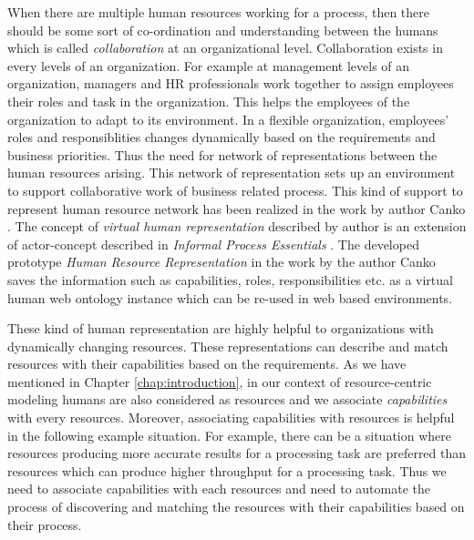 When there are multiple human resources working for a process, then there should be some sort of co-ordination and understanding between the humans which is called \textit{collaboration} at an organizational level. Collaboration exists in every levels of an organization. For example at management levels of an organization, managers and HR professionals work together to assign employees their roles and task in the organization. This helps the employees of the organization to adapt to its environment. In a flexible organization, employees' roles and responsiblities changes dynamically based on the requirements and business priorities. Thus the need for network of representations between the human resources arising. This network of representation sets up an environment to support collaborative work of business related process. This kind of support to represent human resource network has been realized in the work by author Canko \cite{Canko2015}. The concept of \textit{virtual human representation} described by author \cite{Canko2015} is an extension of actor-concept described in \textit{Informal Process Essentials} \cite{Sungur2014a}. The developed prototype \textit{Human Resource Representation} in the work by the author Canko\cite{Canko2015} saves the information such as capabilities, roles, responsibilities etc.  as a virtual human web ontology instance which can be re-used in web based environments.

These kind of human representation are highly helpful to organizations with dynamically changing resources. These representations can describe and match resources with their capabilities based on the requirements. As we have mentioned in Chapter \ref{chap:introduction}, in our context of resource-centric modeling humans are also considered as resources and we associate \textit{capabilities} with every resources. Moreover, associating capabilities with resources is helpful in the following example situation. For example, there can be a situation where resources producing more accurate results for a processing task are preferred than resources which can produce higher throughput for a processing task. Thus we need to associate capabilities with each resources and need to automate the process of discovering and matching the resources with their capabilities based on their process. 

